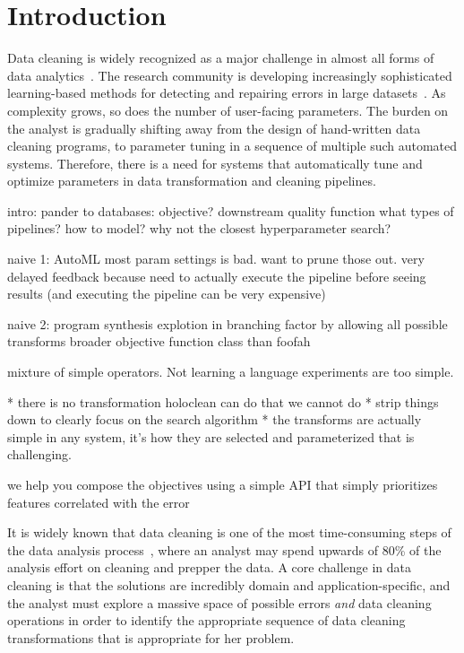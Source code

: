 \section{Introduction}\label{intro}\sloppy




Data cleaning is widely recognized as a major challenge in almost all forms of data analytics~\cite{nytimes}. 
The research community is developing increasingly sophisticated learning-based methods for detecting and repairing errors in large datasets~\cite{dc, rekatsinas2017holoclean, DBLP:journals/pvldb/KrishnanWWFG16, DBLP:conf/sigmod/ChuIKW16, mudgal2018deep, doan2018toward}.
As complexity grows, so does the number of user-facing parameters.
The burden on the analyst is gradually shifting away from the design of hand-written data cleaning programs, to parameter tuning in a sequence of multiple such automated systems.
Therefore, there is a need for systems that automatically tune and optimize parameters in data transformation and cleaning pipelines.



intro:
pander to databases: 
objective?  downstream quality function
what types of pipelines? how to model?
why not the closest hyperparameter search?

naive 1: AutoML
most param settings is bad.  want to prune those out.
very delayed feedback because need to actually execute the pipeline before seeing results (and executing the pipeline can be very expensive)

naive 2: program synthesis
explotion in branching factor by allowing all possible transforms
broader objective function class than foofah

mixture of simple operators.  Not learning a language
experiments are too simple.  

* there is no transformation holoclean can do that we cannot do
* strip things down to clearly focus on the search algorithm 
* the transforms are actually simple in any system, it's how they are selected and parameterized that is challenging.  

we help you compose the objectives using a simple API that simply prioritizes features correlated with the error


It is widely known that data cleaning is one of the most time-consuming steps of the data analysis process~\cite{nytimes}, where an analyst may spend upwards of 80\% of the analysis effort on cleaning and prepper the data.  A core challenge in data cleaning is that the solutions are incredibly domain and application-specific, and the analyst must explore a massive space of possible errors {\it and} data cleaning operations in order to identify the appropriate sequence of data cleaning transformations that is appropriate for her problem.

